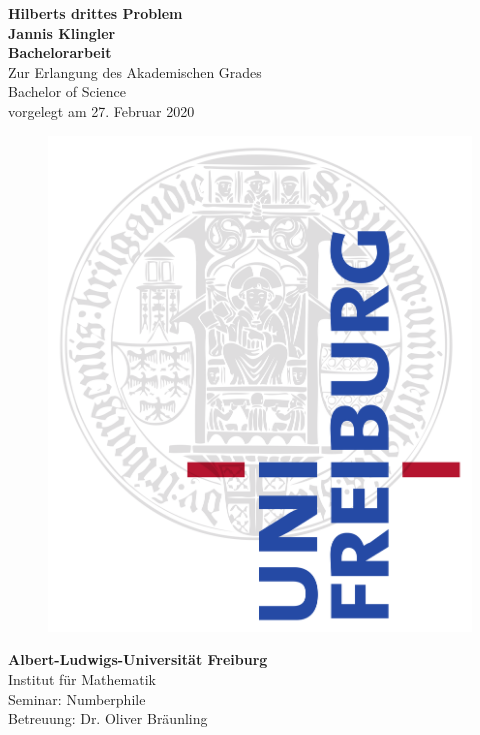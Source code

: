 \documentclass[11pt,titlepage]{article}
\theoremstyle{definition}
\theoremstyle{remark}
\begin{document}
	\setlength{\parindent}{0em}
	\onehalfspacing
	\begin{titlepage}
		\begin{center}
			\huge\textbf{Hilberts drittes Problem}\\
			\vspace{1.2cm}
			\LARGE\textbf{{Jannis Klingler}}\\
			\vspace{0.5cm}
			\LARGE\textbf{{Bachelorarbeit}}\\
			\vspace{0.5cm}
			\normalsize
			Zur Erlangung des Akademischen Grades\\
			Bachelor of Science\\
			\vspace{0.3cm}
			vorgelegt am 27. Februar 2020 \\
			\vspace{0.7cm}
			
			\begin{figure}[h!]
				\centering
				\includegraphics[scale=0.07]{UniFreiburgLogo.png}
			\end{figure}
			
			\vspace{0.7cm}
			\large \textbf{Albert-Ludwigs-Universität Freiburg}\\
			\vspace{0.2cm}
			\large {Institut für Mathematik}\\
			\vspace{1cm}
			\large {Seminar: Numberphile}\\
			\large {Betreuung: Dr. Oliver Bräunling}\\
			\vspace{1.8cm}
		\end{center}
	\end{titlepage}
	
\end{document}
